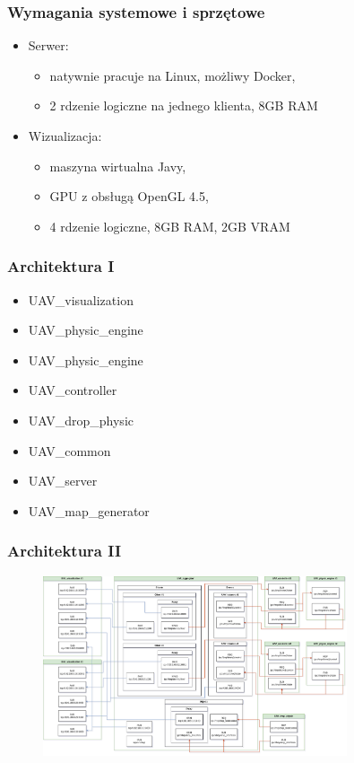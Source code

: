 \documentclass[aspectratio=169]{beamer}
\begin{document}
\begin{frame}
	\frametitle{Wymagania systemowe i sprzętowe}
	\begin{itemize}
	\item<2-> Serwer:
		\begin{itemize}
		\item<3-> natywnie pracuje na Linux, możliwy Docker,
		\item<4-> 2 rdzenie logiczne na jednego klienta, 8GB RAM 
		\end{itemize}
	\item<5-> Wizualizacja:
		\begin{itemize}
		\item<6-> maszyna wirtualna Javy,
		\item<7-> GPU z obsługą OpenGL 4.5,
		\item<8-> 4 rdzenie logiczne, 8GB RAM, 2GB VRAM 
		\end{itemize}	
	\end{itemize}
\end{frame}


\begin{frame} %
	\frametitle{Architektura I}
	\begin{itemize}
		\item<2-> UAV\_visualization
		\item<3-> UAV\_physic\_engine
		\item<4-> UAV\_physic\_engine
		\item<5-> UAV\_controller
		\item<6-> UAV\_drop\_physic
		\item<7-> UAV\_common
		\item<8-> UAV\_server
		\item<9-> UAV\_map\_generator
	\end{itemize}
\end{frame}

\begin{frame}
	\frametitle{Architektura II}
	\begin{figure}
		\centering
		\includegraphics[width=0.8\textwidth]{ZMQinMINIUAV.drawio.png}
	\end{figure}
\end{frame}
\end{document}
